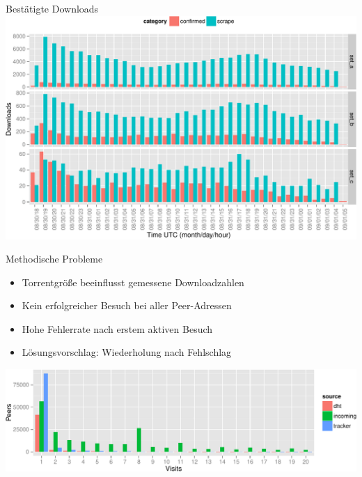 \documentclass[dvipsnames]{beamer} %
\begin{document}
	\begin{frame}{Bestätigte Downloads}
    \includegraphics[width=\textwidth]{../result/2015-08-30_20-combined_download_set-crop}
	\end{frame}

	\begin{frame}{Methodische Probleme}
		\begin{itemize}
			\item Torrentgröße beeinflusst gemessene Downloadzahlen
			\item Kein erfolgreicher Besuch bei  aller Peer-Adressen
			\item Hohe \alert{Fehlerrate} nach erstem aktiven Besuch
			\item Lösungsvorschlag: \alert{Wiederholung} nach Fehlschlag
		\end{itemize}

		\vspace{0.5cm}
    \includegraphics[page=2, width=\textwidth]{../result/2015-08-30_20-combined_visits-crop}
	\end{frame}
\end{document}
